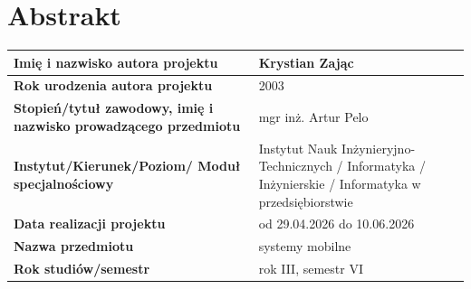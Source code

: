 
\renewcommand{\rmdefault}{ptm} %
\renewcommand{\sfdefault}{phv} %
\chapter*{\fontsize{12}{14}\selectfont Abstrakt}

\vspace{0.5cm}
\noindent
\begin{tabular}{|p{5cm}|p{10cm}|}
\hline
\textbf{Imię i nazwisko autora projektu} & Krystian Zając\\
\hline
\textbf{Rok urodzenia autora projektu} & 2003\\
\hline
\textbf{Stopień/tytuł zawodowy, imię i nazwisko prowadzącego przedmiotu} & mgr inż. Artur Pelo\\
\hline
\textbf{Instytut/Kierunek/Poziom/ Moduł specjalnościowy} & Instytut Nauk Inżynieryjno-Technicznych / Informatyka / Inżynierskie / Informatyka w przedsiębiorstwie\\
\hline
\textbf{Data realizacji projektu} & od 29.04.2026 do 10.06.2026\\
\hline
\textbf{Nazwa przedmiotu} & systemy mobilne\\
\hline
\textbf{Rok studiów/semestr} & rok III, semestr VI\\
\hline
\end{tabular}

\vspace{1.5cm}

